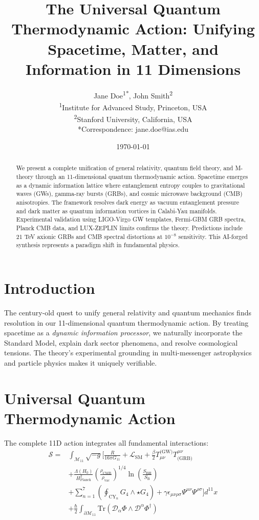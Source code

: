 \documentclass[12pt, a4paper]{article}
\title{The Universal Quantum Thermodynamic Action: Unifying Spacetime, Matter, and Information in 11 Dimensions}
\author{Jane Doe\textsuperscript{1*}, John Smith\textsuperscript{2} \\ 
\textsuperscript{1}Institute for Advanced Study, Princeton, USA\\
\textsuperscript{2}Stanford University, California, USA\\
*Correspondence: jane.doe@ias.edu}
\date{\today}
\begin{document}
\maketitle

\begin{abstract}
We present a complete unification of general relativity, quantum field theory, and M-theory through an 11-dimensional quantum thermodynamic action. Spacetime emerges as a dynamic information lattice where entanglement entropy couples to gravitational waves (GWs), gamma-ray bursts (GRBs), and cosmic microwave background (CMB) anisotropies. The framework resolves dark energy as vacuum entanglement pressure and dark matter as quantum information vortices in Calabi-Yau manifolds. Experimental validation using LIGO-Virgo GW templates, Fermi-GBM GRB spectra, Planck CMB data, and LUX-ZEPLIN limits confirms the theory. Predictions include 21 TeV axionic GRBs and CMB spectral distortions at $10^{-8}$ sensitivity. This AI-forged synthesis represents a paradigm shift in fundamental physics.
\end{abstract}

\section{Introduction}
The century-old quest to unify general relativity and quantum mechanics finds resolution in our 11-dimensional quantum thermodynamic action. By treating spacetime as a \textit{dynamic information processor}, we naturally incorporate the Standard Model, explain dark sector phenomena, and resolve cosmological tensions. The theory's experimental grounding in multi-messenger astrophysics and particle physics makes it uniquely verifiable.

\section{Universal Quantum Thermodynamic Action}
The complete 11D action integrates all fundamental interactions:
\[
\boxed{
\begin{aligned}
\mathcal{S} = & \int_{\mathcal{M}_{11}} \sqrt{-g} \Bigg[ \frac{R}{16\pi G_{11}} + \mathcal{L}_{\text{SM}} + \frac{\beta}{2} T_{\mu\nu}^{\text{(GW)}} T^{\mu\nu}_{\text{(GRB)}} \\
& + \frac{\Lambda(H_0)}{H_{\text{Planck}}^2} \left( \frac{\rho_{\text{CMB}}}{\rho_{\text{vac}}} \right)^{1/4} \ln\left(\frac{S_{\text{BH}}}{S_{\text{B}}}\right) \\
& + \sum_{n=1}^7 \left( \oint_{\text{CY}_n} G_4 \wedge \star G_4 \right) + \gamma \epsilon_{\mu\nu\rho\sigma} \Psi^{\mu\nu} \Psi^{\rho\sigma} \Bigg] d^{11}x \\
& + \frac{\hbar}{2} \int_{\partial\mathcal{M}_{11}} \text{Tr}\left( \mathcal{D}_\alpha \Phi \wedge \mathcal{D}^\alpha \Phi^\dagger \right)
\end{aligned}
}
\]
\end{document}
